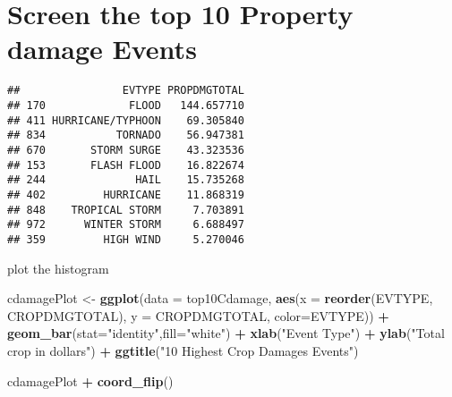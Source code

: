 \documentclass[
]{article}
\newenvironment{Shaded}{\begin{snugshade}}{\end{snugshade}}
\newcommand{\DataTypeTok}[1]{\textcolor[rgb]{0.13,0.29,0.53}{#1}}
\newcommand{\DecValTok}[1]{\textcolor[rgb]{0.00,0.00,0.81}{#1}}
\newcommand{\KeywordTok}[1]{\textcolor[rgb]{0.13,0.29,0.53}{\textbf{#1}}}
\newcommand{\NormalTok}[1]{#1}
\newcommand{\OperatorTok}[1]{\textcolor[rgb]{0.81,0.36,0.00}{\textbf{#1}}}
\newcommand{\StringTok}[1]{\textcolor[rgb]{0.31,0.60,0.02}{#1}}
\begin{document}
\hypertarget{screen-the-top-10-property-damage-events}{%
\section{Screen the top 10 Property damage
Events}\label{screen-the-top-10-property-damage-events}}

\begin{Shaded}
\end{Shaded}

\begin{verbatim}
##                EVTYPE PROPDMGTOTAL
## 170             FLOOD   144.657710
## 411 HURRICANE/TYPHOON    69.305840
## 834           TORNADO    56.947381
## 670       STORM SURGE    43.323536
## 153       FLASH FLOOD    16.822674
## 244              HAIL    15.735268
## 402         HURRICANE    11.868319
## 848    TROPICAL STORM     7.703891
## 972      WINTER STORM     6.688497
## 359         HIGH WIND     5.270046
\end{verbatim}

plot the histogram

\begin{Shaded}
\begin{Highlighting}[]
\NormalTok{cdamagePlot <-}\StringTok{ }\KeywordTok{ggplot}\NormalTok{(}\DataTypeTok{data =}\NormalTok{ top10Cdamage, }\KeywordTok{aes}\NormalTok{(}\DataTypeTok{x =} \KeywordTok{reorder}\NormalTok{(EVTYPE, CROPDMGTOTAL), }\DataTypeTok{y =}\NormalTok{ CROPDMGTOTAL, }\DataTypeTok{color=}\NormalTok{EVTYPE)) }\OperatorTok{+}\StringTok{ }\KeywordTok{geom_bar}\NormalTok{(}\DataTypeTok{stat=}\StringTok{"identity"}\NormalTok{,}\DataTypeTok{fill=}\StringTok{"white"}\NormalTok{) }\OperatorTok{+}\StringTok{ }\KeywordTok{xlab}\NormalTok{(}\StringTok{"Event Type"}\NormalTok{) }\OperatorTok{+}\StringTok{  }\KeywordTok{ylab}\NormalTok{(}\StringTok{"Total crop in dollars"}\NormalTok{) }\OperatorTok{+}\StringTok{  }\KeywordTok{ggtitle}\NormalTok{(}\StringTok{"10 Highest Crop Damages Events"}\NormalTok{) }

\NormalTok{cdamagePlot }\OperatorTok{+}\StringTok{ }\KeywordTok{coord_flip}\NormalTok{()}
\end{Highlighting}
\end{Shaded}
\end{document}
